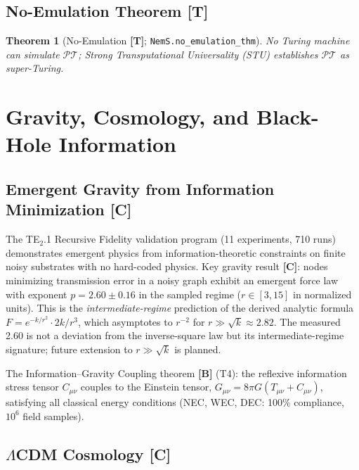 \documentclass[11pt]{article}
\newcommand{\PT}{\mathcal{P}\mathcal{T}}
\newcommand{\tagT}{\textbf{[T]}}
\newcommand{\tagB}{\textbf{[B]}}
\newcommand{\tagC}{\textbf{[C]}}
\theoremstyle{plain}
\newtheorem{theorem}{Theorem}[section]
\theoremstyle{definition}
\theoremstyle{remark}
\begin{document}
\subsection{No-Emulation Theorem \tagT{}}

\begin{theorem}[No-Emulation \tagT{}; \texttt{NemS.no\_emulation\_thm}]
No Turing machine can simulate $\PT$; Strong Transputational Universality (STU)
establishes $\PT$ as super-Turing.
\end{theorem}

\section{Gravity, Cosmology, and Black-Hole Information}
\label{sec:gravity}

\subsection{Emergent Gravity from Information Minimization \tagC{}}

The TE$_2$.1 Recursive Fidelity validation program (11 experiments, 710 runs)
demonstrates emergent physics from information-theoretic constraints on finite noisy substrates
with no hard-coded physics.
Key gravity result \tagC{}:
nodes minimizing transmission error in a noisy graph exhibit an emergent force law
with exponent $p = 2.60 \pm 0.16$ in the sampled regime ($r \in [3,15]$ in normalized units).
This is the \emph{intermediate-regime} prediction of the derived analytic formula
$F = e^{-k/r^2} \cdot 2k/r^3$,
which asymptotes to $r^{-2}$ for $r \gg \sqrt{k} \approx 2.82$.
The measured 2.60 is not a deviation from the inverse-square law but its intermediate-regime signature;
future extension to $r \gg \sqrt{k}$ is planned.

The Information--Gravity Coupling theorem \tagB{} (T4):
the reflexive information stress tensor $C_{\mu\nu}$ couples to the Einstein tensor,
$G_{\mu\nu} = 8\pi G(T_{\mu\nu} + C_{\mu\nu})$,
satisfying all classical energy conditions
(NEC, WEC, DEC: 100\% compliance, $10^6$ field samples).

\subsection{$\Lambda$CDM Cosmology \tagC{}}
\end{document}
